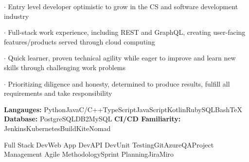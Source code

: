 \documentclass[8pt]{developercv} %
\begin{document}
\vspace{0.5cm}



\begin{minipage}[t]{\textwidth}
	\vspace{-\baselineskip} %
	
	$\cdot$ Entry level developer optimistic to grow in the CS and software development industry

	$\cdot$ Full-stack work experience, including REST and GraphQL, creating user-facing features/products served through cloud computing
	
	$\cdot$ Quick learner, proven technical agility while eager to improve and learn new skills through challenging work problems
	
	$\cdot$ Prioritizing diligence and honesty, determined to produce results, fulfill all requirements and take responsibility

\end{minipage}



\begin{minipage}[t]{\textwidth}
	\vspace{-\baselineskip} %

	\textbf{Langauges:} Python\slashsep Java\slashsep C/C++\slashsep TypeScript\slashsep JavaScript\slashsep Kotlin\slashsep Ruby\slashsep SQL\slashsep Bash\slashsep TeX\\
	\textbf{Database:} PostgreSQL\slashsep DB2\slashsep MySQL \hfill \textbf{CI/CD Familiarity: } Jenkins\slashsep Kubernetes\slashsep BuildKite\slashsep Nomad
\end{minipage}



\begin{minipage}[t]{\textwidth}
	\vspace{-\baselineskip} %

	\begin{center}
		Full Stack Dev\slashsep Web App Dev\slashsep API Dev\slashsep Unit Testing\slashsep Git\slashsep Azure\slashsep QA\slashsep Project Management\slashsep
		Agile Methodology\slashsep Sprint Planning\slashsep Jira\slashsep Miro
	\end{center}

\end{minipage}
\end{document}
